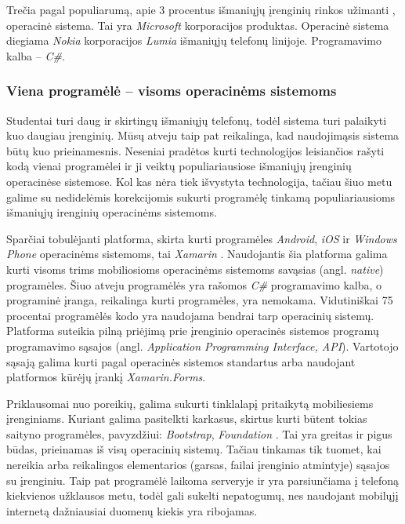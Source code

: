 \documentclass{VUMIFPSkursinis}
\begin{document}

Trečia pagal populiarumą, apie 3 procentus išmaniųjų įrenginių rinkos užimanti \cite{MarketShareByOS}, operacinė sistema. Tai yra \textit{Microsoft} korporacijos produktas. Operacinė sistema diegiama \textit{Nokia} korporacijos \textit{Lumia} išmaniųjų telefonų linijoje. Programavimo kalba – \textit{C\#}.

\subsubsection{Viena programėlė – visoms operacinėms sistemoms}
Studentai turi daug ir skirtingų išmaniųjų telefonų, todėl sistema turi palaikyti kuo daugiau įrenginių. Mūsų atveju taip pat reikalinga, kad naudojimąsis sistema būtų kuo prieinamesnis. Neseniai pradėtos kurti technologijos leisiančios rašyti kodą vienai programėlei ir ji veiktų populiariausiose \cite{MarketShareByOS} išmaniųjų įrenginių operacinėse sistemose. Kol kas nėra tiek išvystyta technologija, tačiau šiuo metu galime su nedidelėmis korekcijomis sukurti programėlę tinkamą populiariausioms išmaniųjų irenginių operacinėms sistemoms.


Sparčiai tobulėjanti platforma, skirta kurti programėles \textit{Android}, \textit{iOS} ir \textit{Windows Phone} operacinėms sistemoms, tai \textit{Xamarin} \cite{xamarin}. Naudojantis šia platforma galima kurti visoms trims mobiliosioms operacinėms sistemoms savąsias (angl. \textit{native}) programėles. Šiuo atveju programėlės yra rašomos \textit{C\#} programavimo kalba, o programinė įranga, reikalinga kurti programėles, yra nemokama. Vidutiniškai 75 procentai programėlės kodo yra naudojama bendrai tarp operacinių sistemų. Platforma suteikia pilną priėjimą prie įrenginio operacinės sistemos programų programavimo sąsajos (angl. \textit{Application Programming Interface, API}). Vartotojo sąsają galima kurti pagal operacinės sistemos standartus arba naudojant platformos kūrėjų įrankį \textit{Xamarin.Forms}.

 \label{webApp}

Priklausomai nuo poreikių, galima sukurti tinklalapį pritaikytą mobiliesiems įrenginiams. Kuriant galima pasitelkti karkasus, skirtus kurti būtent tokias saityno programėles, pavyzdžiui: \textit{Bootstrap}, \textit{Foundation} \cite{cssFrameworks}. Tai yra greitas ir pigus būdas, prieinamas iš visų operacinių sistemų. Tačiau tinkamas tik tuomet, kai nereikia arba reikalingos elementarios (garsas, failai įrenginio atmintyje) sąsajos su įrenginiu. Taip pat programėlė laikoma serveryje ir yra parsiunčiama į telefoną kiekvienos užklausos metu, todėl gali sukelti nepatogumų, nes naudojant mobilųjį internetą dažniausiai duomenų kiekis yra ribojamas.
\end{document}
